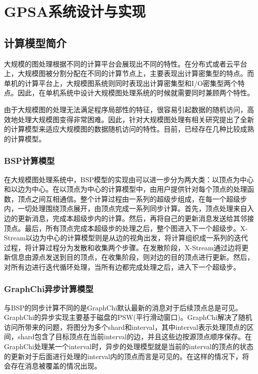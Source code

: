 
\chapter{GPSA系统设计与实现}

\section{计算模型简介}
大规模的图处理根据不同的计算平台会展现出不同的特性。在分布式或者云平台上，大规模图被分割分配在不同的计算节点上，主要表现出计算密集型的特点。而单机的计算平台上，大规模图系统则同时表现出计算密集型和I/O密集型两个特点。因此，在单机系统中设计大规模图处理系统的时候就需要同时兼顾两个特性。

由于大规模图的处理无法满足程序局部性的特征，很容易引起数据的随机访问，高效地处理大规模图变得非常困难。因此，针对大规模图处理有相关研究提出了全新的计算模型来适应大规模图的数据随机访问的特性。目前，已经存在几种比较成熟的计算模型。

\subsection{BSP计算模型}

在大规模图处理系统中，BSP模型的实现由可以进一步分为两大类：以顶点为中心和以边为中心。在以顶点为中心的计算模型中，由用户提供针对每个顶点的处理函数，顶点之间互相通信。整个计算过程由一系列的超级步组成，在每一个超级步内，一切处理围绕顶点展开，由顶点完成一系列同步计算。首先，顶点处理来自入边的更新消息，完成本超级步内的计算。然后，再将自己的更新消息发送给其邻接顶点。最后，所有顶点完成本超级步的处理之后，整个图进入下一个超级步。X-Stream以边为中心的计算模型则是从边的视角出发，将计算组织成一系列的迭代过程，将计算过程分为发散和收集两个步骤。在发散阶段，X-Stream通过边将更新信息由源点发送到目的顶点，在收集阶段，则对边的目的顶点进行更新。然后，对所有边进行迭代循环处理，当所有边都完成处理之后，进入下一个超级步。

\subsection{GraphChi异步计算模型}
与BSP的同步计算不同的是GraphChi默认最新的消息对于后续顶点总是可见。GraphChi的异步实现主要基于磁盘的PSW(平行滑动窗口)。GraphChi解决了随机访问所带来的问题，将图分为多个shard和interval，其中interval表示处理顶点的区间，shard包含了目标顶点在当前interval的边，并且这些边按源顶点顺序保存。在GraphChi处理某一个interval时，异步的处理模型就是当前的interval的顶点的状态的更新对于后面进行处理的interval内的顶点而言是可见的。在这样的情况下，将会存在消息被覆盖的情况出现。


